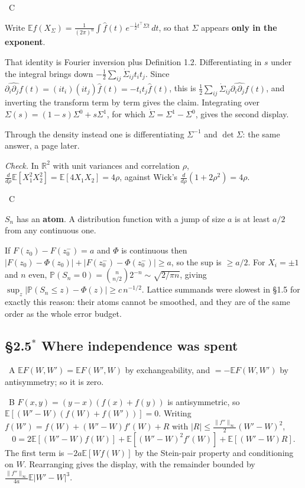 \documentclass[10pt]{article}
\newcommand{\Q}[2]{\medskip\noindent{\color{acc}\textbf{#1}}\ {\scriptsize\color{grey}\textsc{#2}}\quad}
\newcommand{\R}{\mathbb{R}}
\newcommand{\E}{\mathbb{E}}
\newcommand{\Prb}{\mathbb{P}}
\newcommand{\T}{^{\!\top}}
\begin{document}
\Q{1.15}{C}
\begin{idea}
Write $\E f(X_\Sigma)=\frac{1}{(2\pi)^n}\int\hat f(t)\,e^{-\frac12t\T\Sigma t}\,dt$, so that $\Sigma$ appears \textbf{only in the exponent}.
\end{idea}
That identity is Fourier inversion plus Definition 1.2. Differentiating in $s$ under the integral brings down $-\tfrac12\sum_{ij}\dot\Sigma_{ij}t_it_j$. Since $\widehat{\partial_i\partial_jf}(t)=(it_i)(it_j)\hat f(t)=-t_it_j\hat f(t)$, this is $\tfrac12\sum_{ij}\dot\Sigma_{ij}\widehat{\partial_i\partial_jf}(t)$, and inverting the transform term by term gives the claim. Integrating over $\Sigma(s)=(1-s)\Sigma^0+s\Sigma^1$, for which $\dot\Sigma=\Sigma^1-\Sigma^0$, gives the second display.

Through the density instead one is differentiating $\Sigma^{-1}$ and $\det\Sigma$: the same answer, a page later.

\emph{Check.} In $\R^2$ with unit variances and correlation $\rho$, $\frac{d}{d\rho}\E[X_1^2X_2^2]=\E[4X_1X_2]=4\rho$, against Wick's $\frac{d}{d\rho}(1+2\rho^2)=4\rho$.

\Q{1.16}{C}
\begin{idea}
$S_n$ has an \textbf{atom}. A distribution function with a jump of size $a$ is at least $a/2$ from any continuous one.
\end{idea}
If $F(z_0)-F(z_0^-)=a$ and $\Phi$ is continuous then $|F(z_0)-\Phi(z_0)|+|F(z_0^-)-\Phi(z_0^-)|\ge a$, so the sup is $\ge a/2$. For $X_i=\pm1$ and $n$ even, $\Prb(S_n=0)=\binom{n}{n/2}2^{-n}\sim\sqrt{2/\pi n}$, giving $\sup_z|\Prb(S_n\le z)-\Phi(z)|\ge c\,n^{-1/2}$. Lattice summands were slowest in \S1.5 for exactly this reason: their atoms cannot be smoothed, and they are of the same order as the whole error budget.

\subsection{\S2.5$^\ast$ Where independence was spent}

\Q{2.10}{A} $\E F(W,W')=\E F(W',W)$ by exchangeability, and $=-\E F(W,W')$ by antisymmetry; so it is zero.

\Q{2.11}{B} $F(x,y)=(y-x)(f(x)+f(y))$ is antisymmetric, so $\E[(W'-W)(f(W)+f(W'))]=0$. Writing $f(W')=f(W)+(W'-W)f'(W)+R$ with $|R|\le\tfrac{\|f''\|_\infty}{2}(W'-W)^2$,
\[
0=2\E[(W'-W)f(W)]+\E[(W'-W)^2f'(W)]+\E[(W'-W)R].
\]
The first term is $-2a\E[Wf(W)]$ by the Stein-pair property and conditioning on $W$. Rearranging gives the display, with the remainder bounded by $\tfrac{\|f''\|_\infty}{4a}\E|W'-W|^3$.
\end{document}

